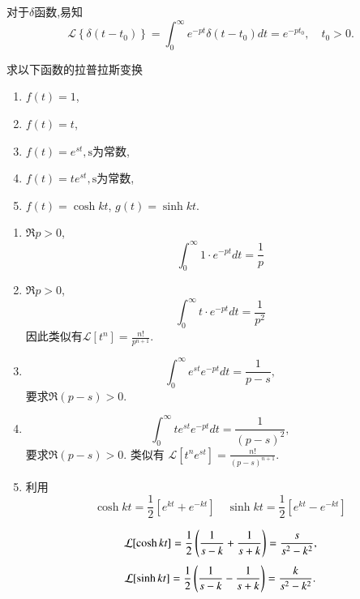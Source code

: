 对于$\delta$函数,易知
$$
\mathcal{L}\left\{\delta\left(t-t_0\right)\right\}=\int_0^{\infty} e^{-p t} \delta\left(t-t_0\right) d t=e^{-p t_0},  \quad t_0>0 .
$$
\begin{examplebox}{求以下函数的拉普拉斯变换
    \begin{enumerate}
        \item $f(t) = 1$,
        \item $f(t) = t$,
        \item $f(t) =e^{s t}, \textrm{s为常数}$,
        \item $f(t) = t e^{s t}, \textrm{s为常数}$,
        \item $f(t) = \cosh {k t}$, $g(t)= \sinh {kt}$.
    \end{enumerate}}

    \begin{enumerate}
        \item $\Re p > 0$, 
            $$\int_{0}^{\infty} 1 \cdot e^{-p t} dt = \frac{1}{p}$$
        \item  $\Re p > 0$, 
            $$\int_{0}^{\infty} t \cdot e^{-p t} dt = \frac{1}{p^2}$$
            因此类似有$\mathcal{L}[t^n] = \frac{n!}{p^{n+1}}$.
        \item $$
            \int_{0}^{\infty} e^{s t} e^{-p t} dt = \frac{1}{p-s} , 
        $$
        要求$\Re (p-s) > 0$.
        \item 
        $$
        \int_{0}^{\infty} t e^{s t} e^{-p t} dt = \frac{1}{(p-s)^2} ,
        $$
        要求$\Re (p-s) > 0$.  
    类似有 $\mathcal{L}[t^n e^{s t}] = \frac{n!}{(p-s)^{n+1}}$.
        \item 利用
        $$
         \cosh{k t}  = \frac{1}{2} \left[ e^{kt} + e^{-kt}\right] \quad 
         \sinh{k t}  = \frac{1}{2} \left[ e^{kt} - e^{-kt}\right] 
        $$

        $$
        \mathcal{L}[ \cosh{k t} ] = {\frac{1}{2}} \left( \frac{1}{s-k} + \frac{1}{s+k} \right) = \frac{s}{s^2 - k^2} ,
        $$
        $$
        \mathcal{L}[ \sinh{k t} ] = {\frac{1}{2}} \left( \frac{1}{s-k} - \frac{1}{s+k} \right) = \frac{k}{s^2 - k^2} .
        $$
    \end{enumerate}
\end{examplebox}

